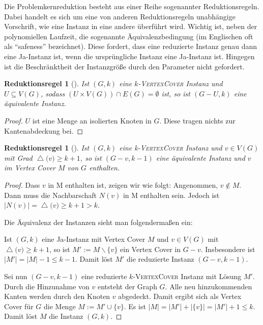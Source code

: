 \documentclass[a4paper,ngerman]{atseminar}
\renewcommand{\deg}[1]{\ensuremath{\operatorname{\triangle}\bigl(#1\bigr)}\xspace}
\newcounter{reductionruleCounter}
\newtheorem{reductionrule}[reductionruleCounter]{\textbf{Reduktionsregel}}
\begin{document}
\begin{example}
    Die Problemkernreduktion besteht aus einer Reihe sogenannter Reduktionsregeln. Dabei handelt es sich um eine von anderen Reduktionsregeln unabhängige
    Vorschrift, wie eine Instanz in eine andere überführt wird.
    Wichtig ist, neben der polynomiellen Laufzeit, die sogenannte Äquivalenzbedingung (im Englischen oft als \enquote{safeness} bezeichnet).
    Diese fordert, dass eine reduzierte Instanz genau dann eine Ja-Instanz ist, wenn die ursprüngliche Instanz eine Ja-Instanz ist.
    Hingegen ist die Beschränktheit der Instanzgröße durch den Parameter nicht gefordert.

    \begin{reductionrule}[\cite{Beyond}]
      \label{OE:reduction:1}
      Ist $(G, k)$ eine $k$-\textsc{VertexCover} Instanz und $U \subseteq V(G)$, sodass $ (U \times V(G)) \cap E(G) = \emptyset $ ist, so ist $(G - U, k)$
      eine äquivalente Instanz.
    \end{reductionrule}
    \begin{proof}
      $U$ ist eine Menge an isolierten Knoten in $G$. Diese tragen nichts zur Kantenabdeckung bei.
    \end{proof}

    \begin{reductionrule}[\cite{Beyond}]
      \label{OE:reduction:2}
      Ist $(G, k)$ eine k-\textsc{VertexCover} Instanz und $v \in V(G)$ mit Grad $\deg{v} \geq k + 1$,
      so ist $(G - v, k - 1)$ eine äquivalente Instanz und $v$ im Vertex Cover $M$ von $G$ enthalten.
    \end{reductionrule}
    \begin{proof}
      Dass $v$ in M enthalten ist, zeigen wir wie folgt:
      Angenommen, $v \notin M$. Dann muss die Nachbarschaft $N(v)$ in M enthalten sein. Jedoch ist $|N(v)| = \deg{v} \geq k + 1 > k$.


      \noindent
      Die Äquivalenz der Instanzen sieht man folgendermaßen ein:

      \noindent
      Ist $(G, k)$ eine Ja-Instanz mit Vertex Cover $M$ und $v \in V(G)$ mit $\deg{v} \geq k + 1$, so ist $M' := M \backslash \{v\}$ ein Vertex Cover in $G - v$.
      Insbesondere ist $|M'| = |M| - 1 \leq k -1$.
      Damit löst $M'$ die reduzierte Instanz $(G - v, k - 1)$.

      \noindent
      Sei nun $(G - v, k - 1)$ eine reduzierte $k$-\textsc{VertexCover} Instanz mit Lösung $M'$. Durch die Hinzunahme von $v$ entsteht der Graph $G$.
      Alle neu hinzukommenden Kanten werden durch den Knoten $v$ abgedeckt.
      Damit ergibt sich als Vertex Cover für $G$ die Menge $M := M' \cup \{v\}$.
      Es ist $|M| = |M'| + |\{v\}| = |M'| + 1 \leq k$. Damit löst $M$ die Instanz $(G, k)$.
    \end{proof}


\end{example}
\end{document}
